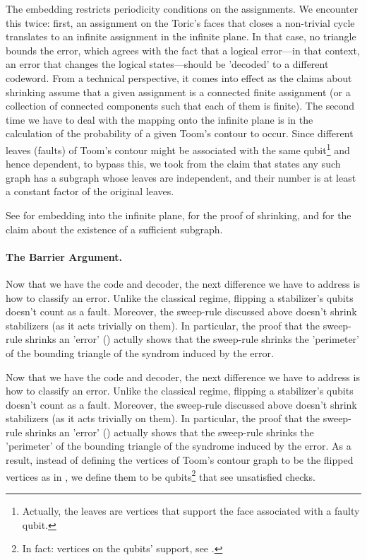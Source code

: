 The embedding restricts periodicity conditions on the assignments. We encounter this twice: first, an assignment on the Toric's faces that closes a non-trivial cycle translates to an infinite assignment in the infinite plane. In that case, no triangle bounds the error, which agrees with the fact that a logical error—in that context, an error that changes the logical states—should be 'decoded' to a different codeword. From a technical perspective, it comes into effect as the claims about shrinking assume that a given assignment is a connected finite assignment (or a collection of connected components such that each of them is finite).
The second time we have to deal with the mapping onto the infinite plane is in the calculation of the probability of a given Toom's contour to occur.
Since different leaves (faults) of Toom's contour might be associated with the same qubit\footnote{Actually, the leaves are vertices that support the face associated with a faulty qubit.} and hence dependent, to bypass this, we took from \cite{gacs2021newversiontoomsproof} the claim that states any such graph has a subgraph whose leaves are independent, and their number is at least a constant factor of the original leaves.


See  for embedding into the infinite plane,  for the proof of shrinking, and  for the claim about the existence of a sufficient subgraph. 


\paragraph{The Barrier Argument.}
Now that we have the code and decoder, the next difference we have to address is how to classify an error. Unlike the classical regime, flipping a stabilizer's qubits doesn't count as a fault. Moreover, the sweep-rule discussed above doesn't shrink stabilizers (as it acts trivially on them). In particular, the proof that the sweep-rule shrinks an 'error' () actully shows that the sweep-rule shrinks the 'perimeter' of the bounding triangle of the syndrom induced by the error.


Now that we have the code and decoder, the next difference we have to address is how to classify an error. Unlike the classical regime, flipping a stabilizer's qubits doesn't count as a fault. Moreover, the sweep-rule discussed above doesn't shrink stabilizers (as it acts trivially on them). In particular, the proof that the sweep-rule shrinks an 'error' () actually shows that the sweep-rule shrinks the 'perimeter' of the bounding triangle of the syndrome induced by the error. As a result, instead of defining the vertices of Toom's contour graph to be the flipped vertices as in \cite{Berman}, we define them to be qubits\footnote{In fact: vertices on the qubits' support, see .} that see unsatisfied checks.

